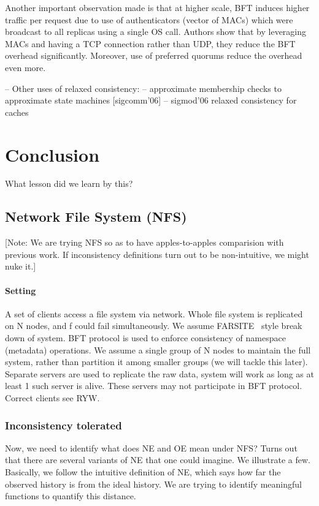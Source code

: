 \documentclass[twocolumn,10pt]{article}
\begin{document}
{Another important observation made is that at higher scale, BFT induces higher
traffic per request due to use of authenticators (vector of MACs) which were
broadcast to all replicas using a single OS call. Authors show that by 
leveraging MACs and having a TCP connection rather than UDP, they reduce the BFT 
overhead significantly. Moreover, use of preferred quorums reduce the 
overhead even more. 

-- Other uses of relaxed consistency:
-- approximate membership checks to approximate state machines [sigcomm'06]
-- sigmod'06 relaxed consistency for caches


\section{Conclusion}

What lesson did we learn by this?







\subsection{Network File System (NFS)}
[Note: We are trying NFS so as to have apples-to-apples comparision
with previous work. If inconsistency definitions turn out to be 
non-intuitive, we might nuke it.]

\paragraph{Setting} A set of clients access a file system via network.
Whole file system is replicated on N nodes, and f could fail simultaneously.
We assume FARSITE~\cite{FARSITE} style break down of system. BFT protocol
is used to enforce consistency of namespace (metadata) operations. We assume a single
group of N nodes to maintain the full system, rather than partition it
among smaller groups (we will tackle this later). Separate servers
are used to replicate the raw data, system will work as long as at least
1 such server is alive. These servers may not participate in BFT protocol.
Correct clients see RYW.

\subsubsection{Inconsistency tolerated} 
Now, we need to identify what does NE and OE mean under NFS? Turns out
that there are several variants of NE that one could imagine. We illustrate
a few. Basically, we follow the intuitive definition of NE, which says
how far the observed history is from the ideal history. We are trying
to identify meaningful functions to quantify this distance.

}
\end{document}
